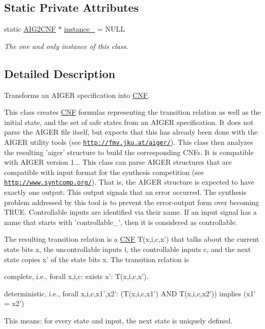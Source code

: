 \subsection*{Static Private Attributes}
\begin{DoxyCompactItemize}
\item 
static \hyperlink{classAIG2CNF}{A\-I\-G2\-C\-N\-F} $\ast$ \hyperlink{classAIG2CNF_ae298ae4804c63f5bac4dfab7528d35ad}{instance\-\_\-} = N\-U\-L\-L
\begin{DoxyCompactList}\small\item\em The one and only instance of this class. \end{DoxyCompactList}\end{DoxyCompactItemize}


\subsection{Detailed Description}
Transforms an A\-I\-G\-E\-R specification into \hyperlink{classCNF}{C\-N\-F}. 

This class creates \hyperlink{classCNF}{C\-N\-F} formulas representing the transition relation as well as the initial state, and the set of safe states from an A\-I\-G\-E\-R specification. It does not parse the A\-I\-G\-E\-R file itself, but expects that this has already been done with the A\-I\-G\-E\-R utility tools (see \href{http://fmv.jku.at/aiger/}{\tt http\-://fmv.\-jku.\-at/aiger/}). This class then analyzes the resulting 'aiger' structure to build the corresponding C\-N\-Fs. It is compatible with A\-I\-G\-E\-R version 1... This class can parse A\-I\-G\-E\-R structures that are compatible with input format for the synthesis competition (see \href{http://www.syntcomp.org/}{\tt http\-://www.\-syntcomp.\-org/}). That is, the A\-I\-G\-E\-R structure is expected to have exactly one output\-: This output signals that an error occurred. The synthesis problem addressed by this tool is to prevent the error-\/output form over becoming T\-R\-U\-E. Controllable inputs are identified via their name. If an input signal has a name that starts with 'controllable\-\_\-', then it is considered as controllable.

The resulting transition relation is a \hyperlink{classCNF}{C\-N\-F} T(x,i,c,x') that talks about the current state bits x, the uncontrollable inputs i, the controllable inputs c, and the next state copies x' of the state bits x. The transition relation is 
\begin{DoxyItemize}
\item complete, i.\-e., forall x,i,c\-: exists x'\-: T(x,i,c,x'). 
\item deterministic, i.\-e., forall x,i,c,x1',x2'\-: (T(x,i,c,x1') A\-N\-D T(x,i,c,x2')) implies (x1' = x2') 
\end{DoxyItemize}This means\-: for every state and input, the next state is uniquely defined.

